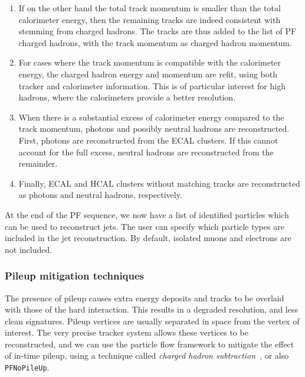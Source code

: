\begin{enumerate}
  \item If on the other hand the total track momentum is smaller than the total calorimeter energy,
then the remaining tracks are indeed consistent with stemming from charged hadrons. The tracks are
thus added to the list of PF charged hadrons, with the track momentum as charged hadron momentum.

  \item For cases where the track momentum is compatible with the calorimeter energy, the charged
hadron energy and momentum are refit, using both tracker and calorimeter information. This is of
particular interest for high \pt hadrons, where the calorimeters provide a better resolution. 
 
  \item When there is a substantial excess of calorimeter energy compared to the track momentum,
photons and possibly neutral hadrons are reconstructed. First, photons are reconstructed from the
ECAL clusters. If this cannot account for the full excess, neutral hadrons are reconstructed from
the remainder.  
 
  \item Finally, ECAL and HCAL clusters without matching tracks are reconstructed as photons and
neutral hadrons, respectively. 
\end{enumerate}

At the end of the PF sequence, we now have a list of identified particles which can be used to
reconstruct jets. The user can specify which particle types are included in the jet reconstruction. 
By default, isolated muons and electrons are not included.  


\subsubsection{Pileup mitigation techniques}

The presence of pileup causes extra energy deposits and tracks to be overlaid with those of the
hard interaction. This results in a degraded resolution, and less clean signatures.
Pileup vertices are usually separated in space from the vertex of interest. The very precise
tracker system allows these vertices to be reconstructed, and we can use the particle flow
framework to mitigate the effect of in-time pileup, using a technique called \textit{charged
hadron subtraction}~\cite{CMS-PAS-JME-14-001}, or also \texttt{PFNoPileUp}. 

